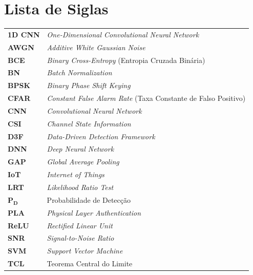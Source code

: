 \documentclass[12pt,a4paper]{article}
\begin{document}
\section*{Lista de Siglas}
{\small
\begin{tabular}{@{}p{1.9cm}p{5.9cm}@{}}
\textbf{1D CNN}    & \textit{One-Dimensional Convolutional Neural Network} \\
\textbf{AWGN}      & \textit{Additive White Gaussian Noise} \\
\textbf{BCE}       & \textit{Binary Cross-Entropy} (Entropia Cruzada Binária) \\
\textbf{BN}        & \textit{Batch Normalization} \\
\textbf{BPSK}      & \textit{Binary Phase Shift Keying} \\
\textbf{CFAR}      & \textit{Constant False Alarm Rate} (Taxa Constante de Falso Positivo) \\
\textbf{CNN}       & \textit{Convolutional Neural Network} \\
\textbf{CSI}       & \textit{Channel State Information} \\
\textbf{D3F}       & \textit{Data-Driven Detection Framework}~\cite{ref_braca} \\
\textbf{DNN}       & \textit{Deep Neural Network} \\
\textbf{GAP}       & \textit{Global Average Pooling} \\
\textbf{IoT}       & \textit{Internet of Things} \\
\textbf{LRT}       & \textit{Likelihood Ratio Test} \\
$\boldsymbol{P_D}$ & Probabilidade de Detecção \\
\textbf{PLA}       & \textit{Physical Layer Authentication} \\
\textbf{ReLU}      & \textit{Rectified Linear Unit} \\
\textbf{SNR}       & \textit{Signal-to-Noise Ratio} \\
\textbf{SVM}       & \textit{Support Vector Machine} \\
\textbf{TCL}       & Teorema Central do Limite \\
\end{tabular}
}
\end{document}
